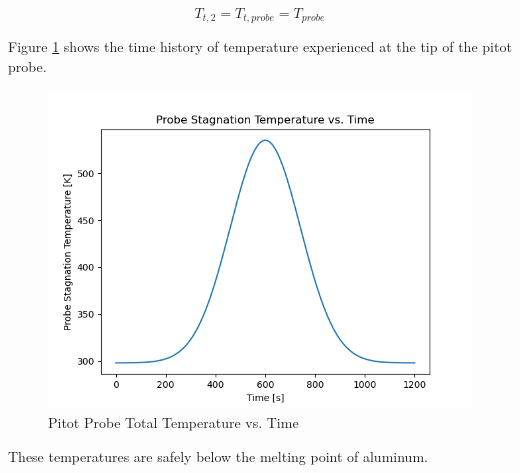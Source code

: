 \documentclass[../main.tex]{subfiles}
\begin{document}
\[
    T_{t,2} = T_{t,probe} = T_{probe}
\]

Figure \ref{Probe_temp} shows the time history of temperature experienced at the tip of the pitot probe.

\begin{figure}[h]
    \centering
    \includegraphics[scale=.7]{../images/problem_2/Probe_T_t_vs_Time_F16.png}
    \caption{Pitot Probe Total Temperature vs. Time}
    \label{Probe_temp}
\end{figure}

These temperatures are safely below the melting point of aluminum.
\end{document}
